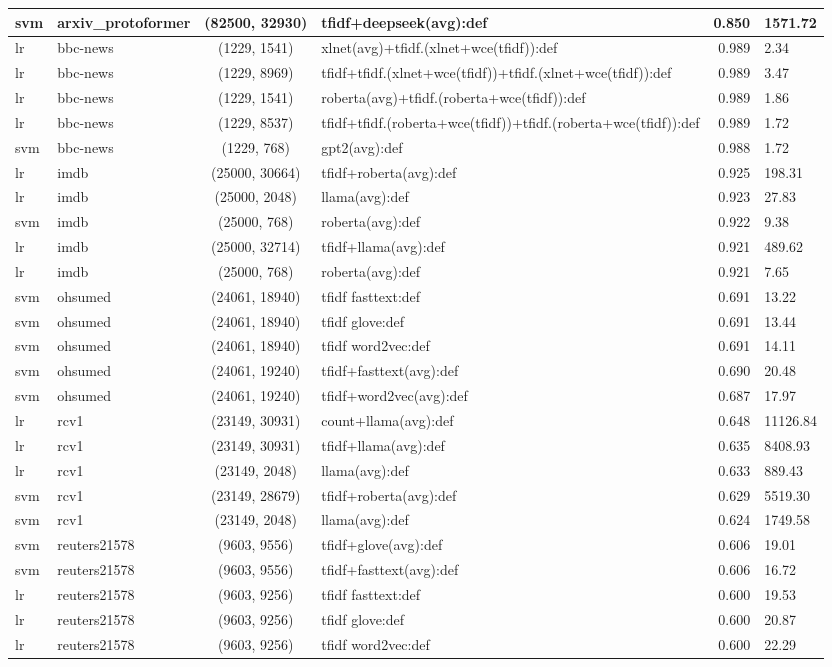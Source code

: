 \documentclass[final]{clv2025}
\begin{document}
\begin{table}[h!]
\begin{tabular}{@{}p{.7cm} p{1.8cm} c >{\raggedright\arraybackslash}p{6.1cm} r p{1.0cm}@{}}
svm & arxiv\_protoformer & (82500, 32930) & tfidf+deepseek(avg):def & 0.850 & 1571.72 \\
\midrule
lr & bbc-news & (1229, 1541) & xlnet(avg)+tfidf.(xlnet+wce(tfidf)):def & 0.989 & 2.34 \\
lr & bbc-news & (1229, 8969) & tfidf+tfidf.(xlnet+wce(tfidf))+tfidf.(xlnet+wce(tfidf)):def & 0.989 & 3.47 \\
lr & bbc-news & (1229, 1541) & roberta(avg)+tfidf.(roberta+wce(tfidf)):def & 0.989 & 1.86 \\
lr & bbc-news & (1229, 8537) & tfidf+tfidf.(roberta+wce(tfidf))+tfidf.(roberta+wce(tfidf)):def & 0.989 & 1.72 \\
svm & bbc-news & (1229, 768) & gpt2(avg):def & 0.988 & 1.72 \\
\midrule
lr & imdb & (25000, 30664) & tfidf+roberta(avg):def & 0.925 & 198.31 \\
lr & imdb & (25000, 2048) & llama(avg):def & 0.923 & 27.83 \\
svm & imdb & (25000, 768) & roberta(avg):def & 0.922 & 9.38 \\
lr & imdb & (25000, 32714) & tfidf+llama(avg):def & 0.921 & 489.62 \\
lr & imdb & (25000, 768) & roberta(avg):def & 0.921 & 7.65 \\
\midrule
svm & ohsumed & (24061, 18940) & tfidf fasttext:def & 0.691 & 13.22 \\
svm & ohsumed & (24061, 18940) & tfidf glove:def & 0.691 & 13.44 \\
svm & ohsumed & (24061, 18940) & tfidf word2vec:def & 0.691 & 14.11 \\
svm & ohsumed & (24061, 19240) & tfidf+fasttext(avg):def & 0.690 & 20.48 \\
svm & ohsumed & (24061, 19240) & tfidf+word2vec(avg):def & 0.687 & 17.97 \\
\midrule
lr & rcv1 & (23149, 30931) & count+llama(avg):def & 0.648 & 11126.84 \\
lr & rcv1 & (23149, 30931) & tfidf+llama(avg):def & 0.635 & 8408.93 \\
lr & rcv1 & (23149, 2048) & llama(avg):def & 0.633 & 889.43 \\
svm & rcv1 & (23149, 28679) & tfidf+roberta(avg):def & 0.629 & 5519.30 \\
svm & rcv1 & (23149, 2048) & llama(avg):def & 0.624 & 1749.58 \\
\midrule
svm & reuters21578 & (9603, 9556) & tfidf+glove(avg):def & 0.606 & 19.01 \\
svm & reuters21578 & (9603, 9556) & tfidf+fasttext(avg):def & 0.606 & 16.72 \\
lr & reuters21578 & (9603, 9256) & tfidf fasttext:def & 0.600 & 19.53 \\
lr & reuters21578 & (9603, 9256) & tfidf glove:def & 0.600 & 20.87 \\
lr & reuters21578 & (9603, 9256) & tfidf word2vec:def & 0.600 & 22.29 \\
\bottomrule
\end{tabular}
\end{table}
\end{document}
